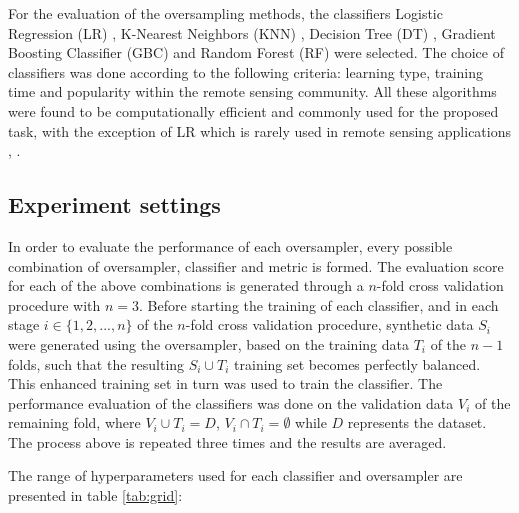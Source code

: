 \documentclass[remotesensing,article,submit,moreauthors,pdftex]{Definitions/mdpi}
\begin{document}
For the evaluation of the oversampling methods, the classifiers Logistic
Regression (LR) \cite{McCullagh1989}, K-Nearest Neighbors (KNN) 
\cite{Cover1967}, Decision Tree (DT) \cite{Salzberg1994}, Gradient
Boosting Classifier (GBC) \cite{Friedman2001} and Random Forest (RF) 
\cite{Liaw2002} were selected. The choice of classifiers was done according 
to the following criteria: learning type, training time and popularity within 
the remote sensing community. All these algorithms were found to be 
computationally efficient and commonly used for the proposed task, with the 
exception of LR which is rarely used in remote sensing applications 
\cite{Khatami2016}, \cite{Maxwell2018}.

\subsection{Experiment settings}

In order to evaluate the performance of each oversampler, every possible
combination of oversampler, classifier and metric is formed. The evaluation
score for each of the above combinations is generated through a \( n \)-fold
cross validation procedure with \( n = 3 \). Before starting the training of
each classifier, and in each stage \(i \in \{1, 2 ,... , n \} \) of the \( n
\)-fold cross validation procedure, synthetic data \( S_{i} \) were generated
using the oversampler, based on the training data \(T_{i} \) of the \( n - 1 \)
folds, such that the resulting \(S_{i} \cup T_{i} \) training set becomes
perfectly balanced. This enhanced training set in turn was used to train the
classifier. The performance evaluation of the classifiers was done on the
validation data \( V_{i} \) of the remaining fold, where \(V_{i} \cup T_{i} = D
\), \(V_{i} \cap T_{i} = \emptyset \) while \( D \) represents the dataset. The
process above is repeated three times and the results are averaged.

The range of hyperparameters used for each classifier and oversampler are
presented in table \ref{tab:grid}:
\end{document}

